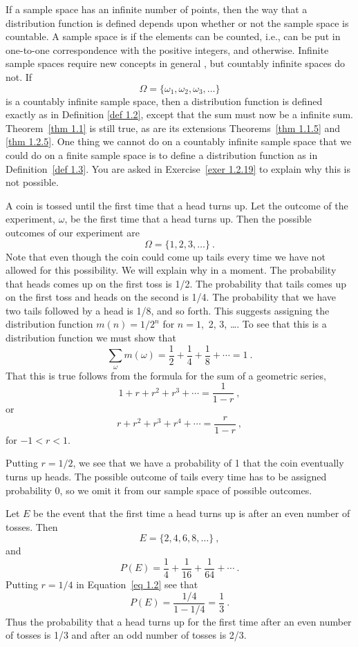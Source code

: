 If a sample space has an infinite number of points, then the way that a
distribution function
is defined depends upon whether or not the sample space is countable.  A
sample
space is  
if the elements can be counted, i.e., can be
put in one-to-one correspondence with the positive integers, and  otherwise.  Infinite sample spaces require new concepts in
general , 
but countably infinite spaces do not.  If
$$
\Omega = \{\omega_1,\omega_2,\omega_3, \dots\}
$$
is a countably infinite sample space, then a distribution function is defined
exactly as in Definition \ref{def 1.2}, except that the sum must now
be a  infinite sum. Theorem~\ref{thm 1.1}
is still true, as are its extensions Theorems~\ref{thm 1.1.5} and \ref{thm 1.2.5}.  
One thing we cannot do on a countably infinite sample space that we could do on 
a finite sample space is
to define a  distribution function as in Definition~\ref{def
1.3}.
You are asked in Exercise~\ref{exer 1.2.19} to explain why this is not
possible.
\begin{example}\label{exam 1.10}
A coin is tossed until the first time that a head turns up.  Let the outcome
of
the experiment, $\omega$, be the first time that a head turns up.  Then the
possible outcomes of our experiment are
$$
\Omega = \{1,2,3, \dots\}\ .
$$
Note that even though the coin could come up tails every time we have not
allowed for this possibility.  We will explain why in a moment.  The
probability that heads comes up on the first toss is 1/2.  The probability
that
tails comes up on the first toss and heads on the second is 1/4.  The
probability that we have two tails followed by a head is 1/8, and so forth. 
This suggests assigning the distribution function $m(n) = 1/2^n$ for $n = 1$,~2, 3, \dots. 
To
see that this is a distribution function we must show that
$$
\sum_{\omega} m(\omega) = \frac12 + \frac14 + \frac18 + \cdots = 1\ .
$$
That this is true follows from the formula for the sum of a geometric series,
$$
1 + r + r^2 + r^3 + \cdots = \frac1{1-r}\ ,
$$
or
\begin{equation}
r + r^2 + r^3 + r^4 + \cdots = \frac r{1-r}\ ,
\label{eq 1.2}
\end{equation} 
for $-1 < r < 1$.
\par
Putting $r = 1/2$, we see that we have a probability of 1 that the coin
eventually turns up heads.  The possible outcome of tails every time has to
be
assigned probability 0, so we omit it from our sample space of possible
outcomes.

Let $E$ be the event that the first time a head turns up is after an even
number of tosses.  Then
$$
E = \{2,4,6,8, \dots\}\ ,
$$
and
$$
P(E) = \frac14 + \frac1{16} + \frac1{64} +\cdots\ .
$$
Putting $r = 1/4$ in Equation~\ref{eq 1.2} see that              
$$
P(E) = \frac{1/4}{1 - 1/4} = \frac13\ .
$$
Thus the probability that a head turns up for the first time after an even
number of tosses is 1/3 and after an odd number of tosses is 2/3.
\end{example}

